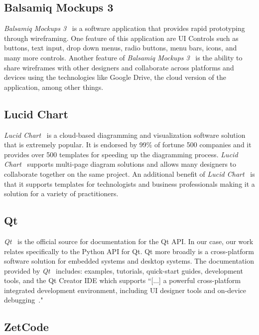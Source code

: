 \subsection{Balsamiq Mockups 3}
\label{sect:balsamiq_mockups_3}

\emph{Balsamiq Mockups 3}~\cite{BALSAMIQ_MOCKUPS_3:1} is a software application that provides rapid prototyping through wireframing. One feature of this application are UI Controls such as buttons, text input, drop down menus, radio buttons, menu bars, icons, and many more controls. Another feature of \emph{Balsamiq Mockups 3}~\cite{BALSAMIQ_MOCKUPS_3:1} is the ability to share wireframes with other designers and collaborate across platforms and devices using the technologies like Google Drive, the cloud version of the application, among other things.

\subsection{Lucid Chart}
\label{sect:lucid_chart}

\emph{Lucid Chart}~\cite{LUCID_CHART:2} is a cloud-based diagramming and visualization software solution that is extremely popular. It is endorsed by 99\% of fortune 500 companies and it provides over 500 templates for speeding up the diagramming process. \emph{Lucid Chart}~\cite{LUCID_CHART:2} supports multi-page diagram solutions and allows many designers to collaborate together on the same project. An additional benefit of \emph{Lucid Chart}~\cite{LUCID_CHART:2} is that it supports templates for technologists and business professionals making it a solution for a variety of practitioners.

\subsection{Qt}
\label{sect:qt}

\emph{Qt}~\cite{QT:3} is the official source for documentation for the Qt API. In our case, our work relates specifically to the Python API for Qt. Qt more broadly is a cross-platform software solution for embedded systems and desktop systems. The documentation provided by \emph{Qt}~\cite{QT:3} includes: examples, tutorials, quick-start guides, development tools, and the Qt Creator IDE which supports ``[...] a powerful cross-platform integrated development environment, including UI designer tools and on-device debugging~\cite{QT:3}."

\subsection{ZetCode}
\label{sect:zetcode}

